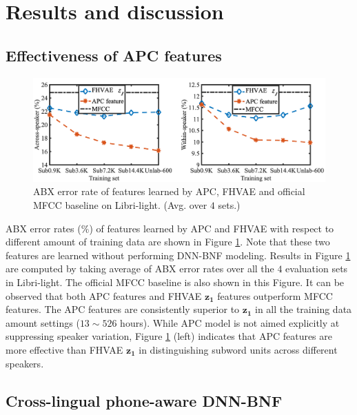 \documentclass[a4paper]{article}
\begin{document}
\section{Results and discussion}
\subsection{Effectiveness of APC features }
\begin{figure}[!t]
    \centering
    \includegraphics[width=\linewidth]{apc_fhvae_mfcc.png}
    \caption{ABX error rate  of features learned by APC, FHVAE and official MFCC baseline on Libri-light. (Avg. over $4$ sets.) }
    \label{fig:apc_fhvae_mfcc}
\end{figure}
ABX error rates ($\%$) of features learned by APC and FHVAE with respect to different amount of training data are shown in Figure \ref{fig:apc_fhvae_mfcc}. Note that these two features are learned without performing DNN-BNF modeling. Results in  Figure \ref{fig:apc_fhvae_mfcc} are computed by taking average of ABX error rates over all the $4$ evaluation sets in Libri-light. The official MFCC baseline   \cite{kahn2019librilight} is also shown in this Figure. It can be observed that both APC features and FHVAE $\bm{z_1}$ features outperform MFCC features. The APC features are consistently superior to $\bm{z_1}$ in all the training data amount settings ($13 \sim 526$ hours). 
While APC model is not aimed explicitly at suppressing speaker variation,   
Figure \ref{fig:apc_fhvae_mfcc} (left) indicates that APC features are more effective than FHVAE $\bm{z_1}$ in distinguishing subword units across different speakers.


\subsection{Cross-lingual phone-aware DNN-BNF}
\end{document}
